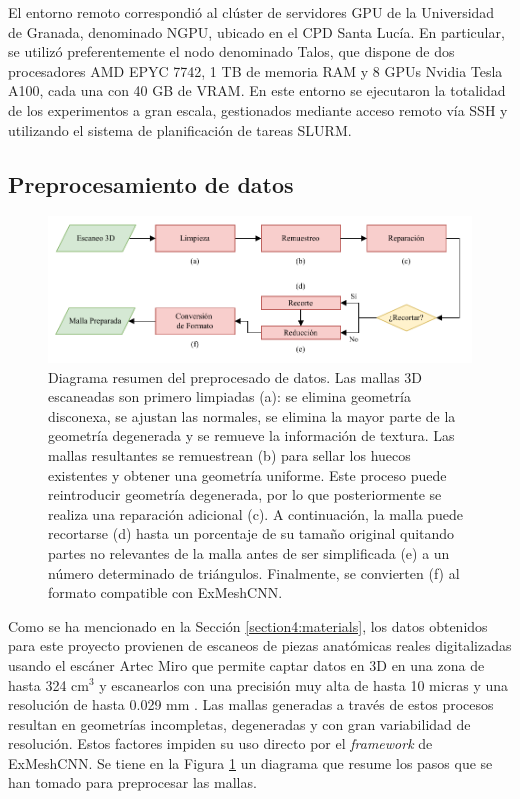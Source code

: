 El entorno remoto correspondió al clúster de servidores GPU de la Universidad de Granada, denominado NGPU, ubicado en el CPD Santa Lucía. En particular, se utilizó preferentemente el nodo denominado Talos, que dispone de dos procesadores AMD EPYC 7742, 1 TB de memoria RAM y 8 GPUs Nvidia Tesla A100, cada una con 40 GB de VRAM. En este entorno se ejecutaron la totalidad de los experimentos a gran escala, gestionados mediante acceso remoto vía SSH y utilizando el sistema de planificación de tareas SLURM.

\subsection{Preprocesamiento de datos}

\begin{figure}[h]
    \includegraphics[width=\linewidth]{figures/4_materials-methods/mesh_preparation_pipeline.pdf}
    \caption[Diagrama resumen del preprocesado de datos]{Diagrama resumen del preprocesado de datos. Las mallas 3D escaneadas son primero limpiadas (a): se elimina geometría disconexa, se ajustan las normales, se elimina la mayor parte de la geometría degenerada y se remueve la información de textura. Las mallas resultantes se remuestrean (b) para sellar los huecos existentes y obtener una geometría uniforme. Este proceso puede reintroducir geometría degenerada, por lo que posteriormente se realiza una reparación adicional (c). A continuación, la malla puede recortarse (d) hasta un porcentaje de su tamaño original quitando partes no relevantes de la malla antes de ser simplificada (e) a un número determinado de triángulos. Finalmente, se convierten (f) al formato compatible con ExMeshCNN.}
    \label{mesh_preparation_pipeline}
\end{figure}

Como se ha mencionado en la Sección \ref{section4:materials}, los datos obtenidos para este proyecto provienen de escaneos de piezas anatómicas reales digitalizadas usando el escáner Artec Miro que permite captar datos en 3D en una zona de hasta 324 cm$^3$ y escanearlos con una precisión muy alta de hasta 10 micras y una resolución de hasta 0.029 mm \cite{artec_data}. Las mallas generadas a través de estos procesos resultan en geometrías incompletas, degeneradas y con gran variabilidad de resolución. Estos factores impiden su uso directo por el \textit{framework} de ExMeshCNN. Se tiene en la Figura \ref{mesh_preparation_pipeline} un diagrama que resume los pasos que se han tomado para preprocesar las mallas.

